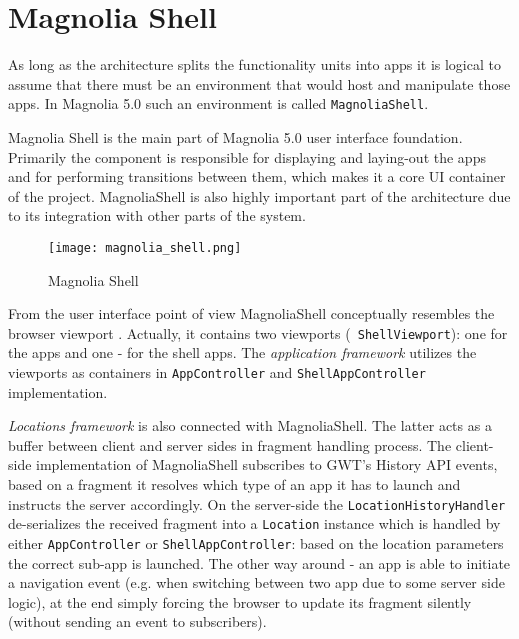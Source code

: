 \section{Magnolia Shell}
As long as the architecture splits the functionality units into apps it is
logical to assume that there must be an environment that would host and
manipulate those apps. In Magnolia 5.0 such an environment is called
\texttt{MagnoliaShell}.

Magnolia Shell is the main part of Magnolia 5.0 user interface foundation.
Primarily the component is responsible for displaying and laying-out the apps
and for performing transitions between them, which makes it a core UI container
of the project.
MagnoliaShell is also highly important part of the architecture due to its
integration with other parts of the system.
 

\begin{figure}[H] \centering \texttt{[image: magnolia\_shell.png]}
	\caption{Magnolia Shell}
	\label{fig:m_shell}
\end{figure}

From the user interface point of view MagnoliaShell conceptually resembles the
browser viewport \cite{mshell_wiki}.
Actually, it contains two viewports (\texttt{ ShellViewport}): one for the apps
and one - for the shell apps.
 The \emph{ application framework } utilizes the viewports as containers in
 \texttt{AppController} and \texttt{ShellAppController} implementation.

\emph{Locations framework} is also connected with MagnoliaShell. The latter acts
as a buffer between client and server sides in fragment handling process. The
client-side implementation of MagnoliaShell subscribes to GWT's History API
events, based on a fragment it resolves which type of an app it has to launch
and instructs the server accordingly. On the server-side the
\texttt{LocationHistoryHandler} de-serializes the received fragment into a
\texttt{Location} instance which is handled by either \texttt{AppController} or
\texttt{ShellAppController}: based on the location parameters the correct
sub-app is launched. The other way around - an app is able to initiate a
navigation event (e.g. when switching between two app due to some server side
logic), at the end simply forcing the browser to update its fragment silently
(without sending an event to subscribers).

